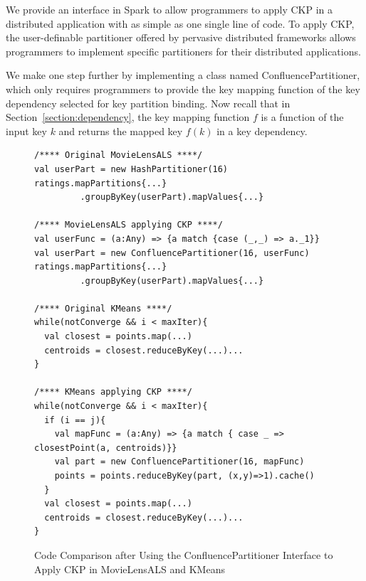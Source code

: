 \documentclass[10pt,journal,compsoc]{IEEEtran}
\makeatletter
\newcommand{\removelatexerror}{\let\@latex@error\@gobble}
\makeatother
\begin{document}
We provide an interface in Spark to allow programmers to apply CKP in a
distributed application with as simple as one single line of code.
To apply CKP, the user-definable partitioner offered by pervasive distributed frameworks allows programmers to implement specific partitioners for their distributed applications. 

We make one step further by implementing a class named ConfluencePartitioner, 
which only requires programmers to provide the key mapping function 
of the key dependency selected for key partition binding. 
Now recall that in Section~\ref{section:dependency}, the key mapping function
$f$ is a function of the input key $k$ and returns the mapped key $f(k)$ in a 
key dependency.


\begin{figure}[!t]
\removelatexerror
\begin{lstlisting}
/**** Original MovieLensALS ****/
val userPart = new HashPartitioner(16)
ratings.mapPartitions{...}
         .groupByKey(userPart).mapValues{...}

/**** MovieLensALS applying CKP ****/
val userFunc = (a:Any) => {a match {case (_,_) => a._1}}
val userPart = new ConfluencePartitioner(16, userFunc)
ratings.mapPartitions{...}
         .groupByKey(userPart).mapValues{...}

/**** Original KMeans ****/
while(notConverge && i < maxIter){
  val closest = points.map(...)
  centroids = closest.reduceByKey(...)...
}

/**** KMeans applying CKP ****/
while(notConverge && i < maxIter){
  if (i == j){
    val mapFunc = (a:Any) => {a match { case _ => closestPoint(a, centroids)}}
    val part = new ConfluencePartitioner(16, mapFunc)
    points = points.reduceByKey(part, (x,y)=>1).cache()
  }
  val closest = points.map(...)
  centroids = closest.reduceByKey(...)...
}

\end{lstlisting}
\caption{Code Comparison after Using the ConfluencePartitioner Interface to Apply CKP in MovieLensALS and KMeans}
\label{fig:code}
\end{figure}
\end{document}
